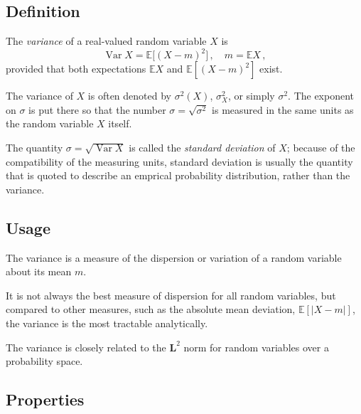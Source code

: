 \documentclass[12pt]{article}
\newcommand{\abs}[1]{\lvert#1\rvert}
\newcommand{\Le}{\mathbf{L}}
\newcommand{\E}{\mathbb{E}}
\DeclareMathOperator{\Var}{Var}
\begin{document}


\subsection*{Definition}
The \emph{variance} of a real-valued random variable $X$ is
\[
\Var X = \E\bigl[ (X - m)^2 \bigr]\,, \quad m = \E X\,,
\]
provided that both expectations $\E X$ and $\E[(X-m)^2]$ exist.

The variance of $X$ is often denoted by $\sigma^2(X)$, $\sigma^2_X$,
or simply $\sigma^2$.
The exponent on $\sigma$ is put there so that the number 
$\sigma = \sqrt{\sigma^2}$ 
is measured in the same units as the random variable $X$
itself.  

The quantity $\sigma = \sqrt{\Var X}$ is called the \emph{standard deviation}
of $X$; 
because of the compatibility of the measuring units, 
standard deviation is usually the quantity that is quoted
to describe an emprical probability distribution, rather than the variance.

\subsection*{Usage}

The variance is a measure of the dispersion or variation
of a random variable
about its mean $m$.

It is not always the best measure of dispersion for all random variables,
but compared to other measures,
such as the absolute mean deviation, $\E[ \abs{X-m} ]$,
the variance is the most tractable analytically.

The variance is closely related to the $\Le^2$ norm for
random variables over a probability space.

\subsection*{Properties}
\end{document}
